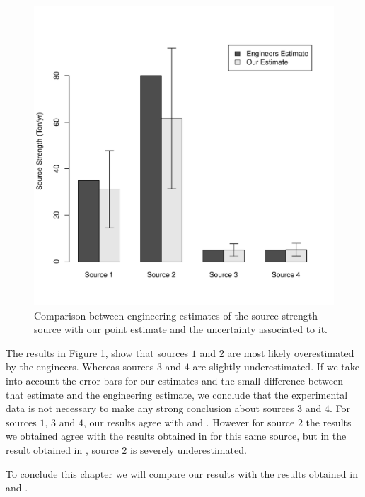 \documentclass{sfuthesis}
\begin{document}
\begin{figure}[H]
\centering
\includegraphics[scale=0.5]{./FigChap4/qUncertainty}
\caption{Comparison between engineering estimates of the source strength source with 
our point estimate and the uncertainty associated to it.}
\label{figQUnicertainty}
\end{figure}


\noindent The results in Figure \ref{figQUnicertainty}, show that sources $1$ and $2$ are most likely overestimated by the engineers.
Whereas sources $3$ and $4$ are  slightly underestimated. If we take into account the error bars for our estimates and
the small difference between that estimate and the engineering estimate, we conclude that the experimental data
is not necessary to make any strong conclusion about sources $3$ and $4$.
For sources $1$, $3$ and $4$, our results agree
with \cite{lushi2010inverse} and \cite{hosseini2016airborne}. However for  source $2$ the results
we obtained  agree with the results obtained in \cite{lushi2010inverse} for this same source, but in the result obtained in \cite{hosseini2016airborne}, source
$2$ is severely underestimated. 


To conclude this chapter we will compare our results with the results obtained in \cite{lushi2010inverse} and \cite{hosseini2016airborne}.
\end{document}

